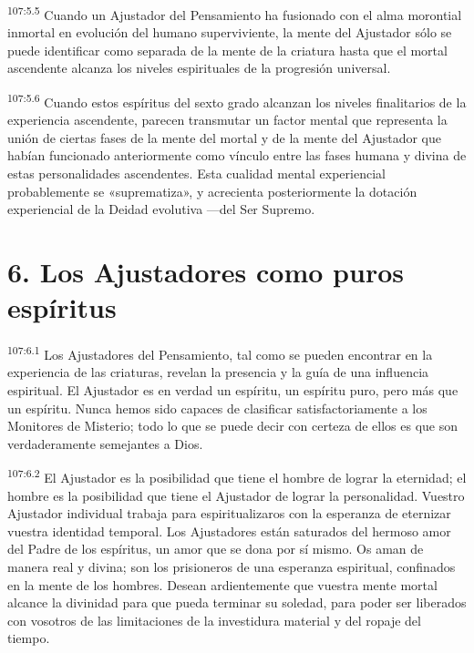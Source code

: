\par
\textsuperscript{107:5.5} Cuando un Ajustador del Pensamiento ha fusionado con el alma morontial inmortal en evolución del humano superviviente, la mente del Ajustador sólo se puede identificar como separada de la mente de la criatura hasta que el mortal ascendente alcanza los niveles espirituales de la progresión universal.

\par
\textsuperscript{107:5.6} Cuando estos espíritus del sexto grado alcanzan los niveles finalitarios de la experiencia ascendente, parecen transmutar un factor mental que representa la unión de ciertas fases de la mente del mortal y de la mente del Ajustador que habían funcionado anteriormente como vínculo entre las fases humana y divina de estas personalidades ascendentes. Esta cualidad mental experiencial probablemente se «suprematiza», y acrecienta posteriormente la dotación experiencial de la Deidad evolutiva ---del Ser Supremo.

\section*{6. Los Ajustadores como puros espíritus}
\par
\textsuperscript{107:6.1} Los Ajustadores del Pensamiento, tal como se pueden encontrar en la experiencia de las criaturas, revelan la presencia y la guía de una influencia espiritual. El Ajustador es en verdad un espíritu, un espíritu puro, pero más que un espíritu. Nunca hemos sido capaces de clasificar satisfactoriamente a los Monitores de Misterio; todo lo que se puede decir con certeza de ellos es que son verdaderamente semejantes a Dios.

\par
\textsuperscript{107:6.2} El Ajustador es la posibilidad que tiene el hombre de lograr la eternidad; el hombre es la posibilidad que tiene el Ajustador de lograr la personalidad. Vuestro Ajustador individual trabaja para espiritualizaros con la esperanza de eternizar vuestra identidad temporal. Los Ajustadores están saturados del hermoso amor del Padre de los espíritus, un amor que se dona por sí mismo. Os aman de manera real y divina; son los prisioneros de una esperanza espiritual, confinados en la mente de los hombres. Desean ardientemente que vuestra mente mortal alcance la divinidad para que pueda terminar su soledad, para poder ser liberados con vosotros de las limitaciones de la investidura material y del ropaje del tiempo.

